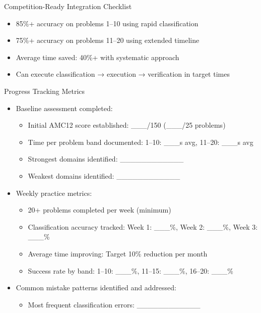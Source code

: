 \documentclass{article}
\begin{document}
\begin{masterybox}{Competition-Ready Integration Checklist}
\begin{itemize}[nosep]
\begin{itemize}[nosep]
  \item[$\square$] Counting: Case analysis (70--75\% success)
  \end{itemize}
\item[$\square$] 85\%+ accuracy on problems 1--10 using rapid classification
\item[$\square$] 75\%+ accuracy on problems 11--20 using extended timeline
\item[$\square$] Average time saved: 40\%+ with systematic approach
\item[$\square$] Can execute classification → execution → verification in target times
\end{itemize}
\end{masterybox}

\begin{masterybox}{Progress Tracking Metrics}
\begin{itemize}[nosep]
\item[$\square$] Baseline assessment completed:
  \begin{itemize}[nosep]
  \item[$\square$] Initial AMC12 score established: \_\_\_/150 (\_\_\_/25 problems)
  \item[$\square$] Time per problem band documented: 1--10: \_\_\_s avg, 11--20: \_\_\_s avg
  \item[$\square$] Strongest domains identified: \_\_\_\_\_\_\_\_\_\_\_\_
  \item[$\square$] Weakest domains identified: \_\_\_\_\_\_\_\_\_\_\_\_
  \end{itemize}
\item[$\square$] Weekly practice metrics:
  \begin{itemize}[nosep]
  \item[$\square$] 20+ problems completed per week (minimum)
  \item[$\square$] Classification accuracy tracked: Week 1: \_\_\_\%, Week 2: \_\_\_\%, Week 3: \_\_\_\%
  \item[$\square$] Average time improving: Target 10\% reduction per month
  \item[$\square$] Success rate by band: 1--10: \_\_\_\%, 11--15: \_\_\_\%, 16--20: \_\_\_\%
  \end{itemize}
\item[$\square$] Common mistake patterns identified and addressed:
  \begin{itemize}[nosep]
  \item[$\square$] Most frequent classification errors: \_\_\_\_\_\_\_\_\_\_\_\_

\end{itemize}
\end{itemize}
\end{masterybox}
\end{document}
